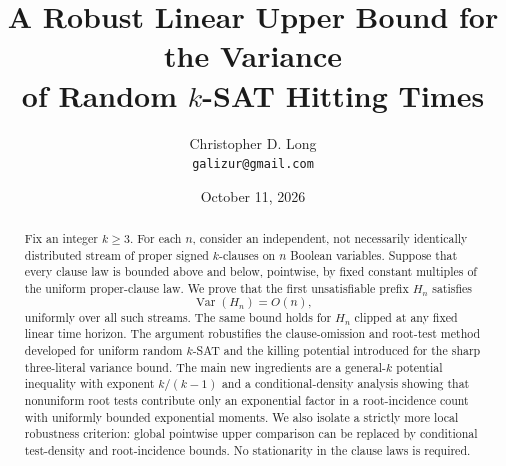 \documentclass[11pt]{article}
\title{A Robust Linear Upper Bound for the Variance\\
of Random \texorpdfstring{$k$}{k}-SAT Hitting Times}
\author{Christopher D. Long\\\small \texttt{galizur@gmail.com}}
\date{October 11, 2026}
\theoremstyle{definition}
\theoremstyle{remark}
\newcommand{\Var}{\operatorname{Var}}
\begin{document}
\maketitle

\begin{abstract}
Fix an integer $k\ge 3$.  For each $n$, consider an independent, not
necessarily identically distributed stream of proper signed $k$-clauses on
$n$ Boolean variables.  Suppose that every clause law is bounded above and
below, pointwise, by fixed constant multiples of the uniform proper-clause
law.  We prove that the first unsatisfiable prefix $H_n$ satisfies
\[
    \Var(H_n)=O(n),
\]
uniformly over all such streams.  The same bound holds for $H_n$ clipped at
any fixed linear time horizon.  The argument robustifies the clause-omission
and root-test method developed for uniform random $k$-SAT and the killing
potential introduced for the sharp three-literal variance bound.  The main
new ingredients are a general-$k$ potential inequality with exponent
$k/(k-1)$ and a conditional-density analysis showing that nonuniform root
tests contribute only an exponential factor in a root-incidence count with
uniformly bounded exponential moments.  We also isolate a strictly more
local robustness criterion: global pointwise upper comparison can be replaced
by conditional test-density and root-incidence bounds.  No stationarity in
the clause laws is required.
\end{abstract}










\end{document}
